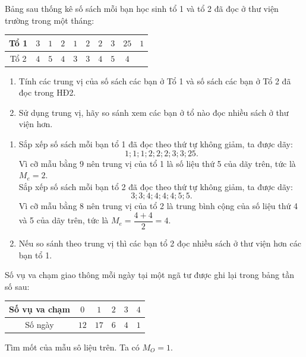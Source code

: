 \begin{bt}%
	Bảng sau thống kê số sách mỗi bạn học sinh tổ 1 và tổ 2 đã đọc ở thư viện trường trong một tháng:
	\begin{center}
		\begin{tabular}{|c|c|c|c|c|c|c|c|c|c|}
			\hline
			Tổ 1	& $3$ & $1$ &$2$ & $1$ & $2$ &$2$ & $3$ & $25$ &$1$ \\
			\hline
			Tổ 2	& $4$ & $5$ & $4$ & $3$ & $3$ &$4$& $5$ & $4$ & \\
			\hline
		\end{tabular}  
	\end{center}
	\begin{enumerate}
		\item Tính các trung vị của số sách các bạn ở Tổ 1 và số sách các bạn ở Tổ 2 đã đọc trong HĐ2.
		\item Sử dụng trung vị, hãy so sánh xem các bạn ở tổ nào đọc nhiều sách ở thư viện hơn.
	\end{enumerate}	
	\loigiai
	{
		\begin{enumerate}
			\item Sắp xếp số sách mỗi bạn tổ 1 đã đọc theo thứ tự không giảm, ta được dãy:
			$$1;1;1;2;2;2;3;3;25.$$
			Vì cỡ mẫu bằng $9$ nên trung vị của tổ 1 là số liệu thứ 5 của dãy trên, tức là $M_e=2$.\\
			Sắp xếp số sách mỗi bạn tổ 2 đã đọc theo thứ tự không giảm, ta được dãy:
			$$3;3;4;4;4;4;5;5.$$
			Vì cỡ mẫu bằng $8$ nên trung vị của tổ 2 là trung bình cộng của số liệu thứ 4 và 5 của dãy trên, tức là $M_e=\dfrac{4+4}{2}=4$.
			\item Nếu so sánh theo trung vị thì các bạn tổ 2 đọc nhiều sách ở thư viện hơn các bạn tổ 1.
		\end{enumerate}		
	}
\end{bt}

\begin{bt}%
	Số vụ va chạm giao thông mỗi ngày tại một ngã tư được ghi lại trong bảng tần số sau:
	\begin{center}
		\begin{tabular}{|c|c|c|c|c|c|}
			\hline
			Số vụ va chạm	& $0$ & $1$ & $2$ &$3$ & $4$   \\
			\hline
			Số ngày	& $12$ & $17$ & $6$ & $4$ & $1$ \\
			\hline
		\end{tabular}  
	\end{center}
	Tìm mốt của mẫu sô liệu trên.	
	\loigiai
	{
		Ta có $M_O=1$.		
	}
\end{bt}

